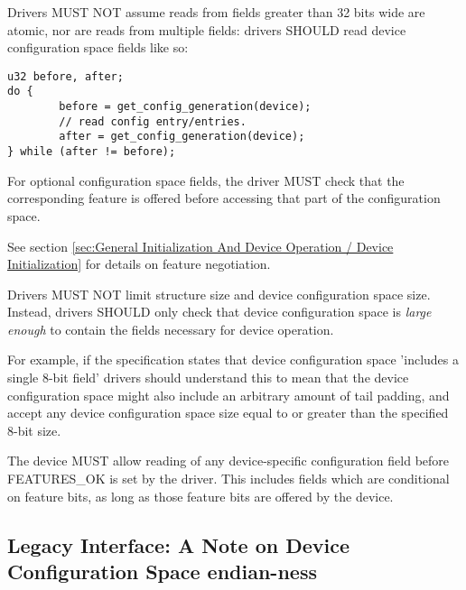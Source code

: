 Drivers MUST NOT assume reads from
fields greater than 32 bits wide are atomic, nor are reads from
multiple fields: drivers SHOULD read device configuration space fields like so:

\begin{lstlisting}
u32 before, after;
do {
        before = get_config_generation(device);
        // read config entry/entries.
        after = get_config_generation(device);
} while (after != before);
\end{lstlisting}

For optional configuration space fields, the driver MUST check that the
corresponding feature is offered before accessing that part of the configuration
space.
\begin{note}
See section \ref{sec:General Initialization And Device Operation / Device Initialization} for details on feature negotiation.
\end{note}

Drivers MUST
NOT limit structure size and device configuration space size.  Instead,
drivers SHOULD only check that device configuration space is {\em large enough} to
contain the fields necessary for device operation.

\begin{note}
For example, if the specification states that device configuration
space 'includes a single 8-bit field' drivers should understand this to mean that
the device configuration space might also include an arbitrary amount of
tail padding, and accept any device configuration space size equal to or
greater than the specified 8-bit size.
\end{note}

The device MUST allow reading of any device-specific configuration
field before FEATURES_OK is set by the driver.  This includes fields which are
conditional on feature bits, as long as those feature bits are offered
by the device.

\subsection{Legacy Interface: A Note on Device Configuration Space endian-ness}\label{sec:Basic Facilities of a Virtio Device / Device Configuration Space / Legacy Interface: A Note on Configuration Space endian-ness}

